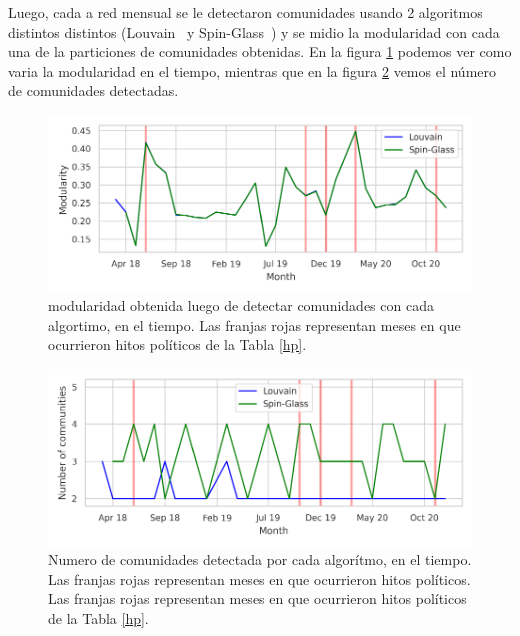 \documentclass{proyectotesis}
\begin{document}
Luego, cada a red mensual se le detectaron comunidades usando 2 algoritmos distintos distintos (Louvain~\cite{blondel_fast_2008} y Spin-Glass~\cite{reichardt_statistical_2006}) y se midio la modularidad con cada una de la particiones de comunidades obtenidas. En la figura \ref{modfig} podemos ver como varia la modularidad en el tiempo, mientras que en la figura \ref{N} vemos el número de comunidades detectadas.\\
\begin{figure}[h!]
    \centering
    \includegraphics[width=0.95\linewidth]{mod.pdf} 
    \vspace{-5mm}
    \caption{modularidad obtenida luego de detectar comunidades con cada algortimo, en el tiempo. Las franjas rojas representan meses en que ocurrieron hitos políticos de la Tabla \ref{hp}.}
    \label{modfig}
\end{figure}
\begin{figure}[h!]
    \centering
    \includegraphics[width=0.95\linewidth]{N.pdf} 
    \vspace{-5mm}
    \caption{Numero de comunidades detectada por cada algorítmo, en el tiempo. Las franjas rojas representan meses en que ocurrieron hitos políticos. Las franjas rojas representan meses en que ocurrieron hitos políticos de la Tabla \ref{hp}.}
    \label{N}
\end{figure}

\renewcommand{\tablename}{Tabla}
\end{document}
